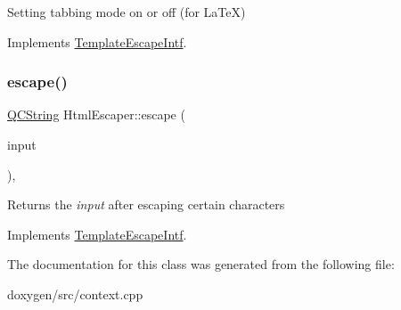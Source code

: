 Setting tabbing mode on or off (for La\+TeX) 

Implements \mbox{\hyperlink{class_template_escape_intf_a40faf7453afe73ccdb52fa8d2619ac3d}{Template\+Escape\+Intf}}.

\mbox{\label{class_html_escaper_a9a3ca4fe8ec6faf9fa4edb2dc85e453c}} 
\subsubsection{\texorpdfstring{escape()}{escape()}}
{\footnotesize\ttfamily \mbox{\hyperlink{class_q_c_string}{Q\+C\+String}} Html\+Escaper\+::escape (\begin{DoxyParamCaption}\item[{const \mbox{\hyperlink{class_q_c_string}{Q\+C\+String}} \&}]{input }\end{DoxyParamCaption})\hspace{0.3cm}{\ttfamily [inline]}, {\ttfamily [virtual]}}

Returns the {\itshape input} after escaping certain characters 

Implements \mbox{\hyperlink{class_template_escape_intf_a9fc463a8281aca9f982866aa26d4f401}{Template\+Escape\+Intf}}.



The documentation for this class was generated from the following file\+:\begin{DoxyCompactItemize}
\item 
doxygen/src/context.\+cpp\end{DoxyCompactItemize}
